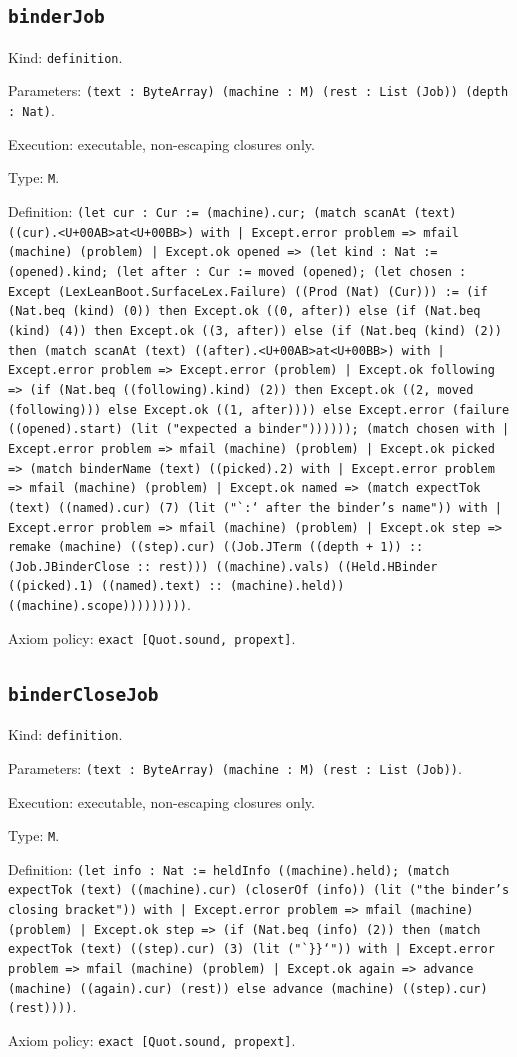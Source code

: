 \documentclass[11pt]{article}
\begin{document}
\subsection*{\texttt{binderJob}}
\noindent Kind: \texttt{definition}.\par
\noindent Parameters: \texttt{(text : ByteArray) (machine : M) (rest : List (Job)) (depth : Nat)}.\par
\noindent Execution: executable, non-escaping closures only.\par
\noindent Type: \texttt{M}.\par
\noindent Definition: \texttt{(let cur : Cur := (machine).cur; (match scanAt (text) ((cur).<U+00AB>at<U+00BB>) with | Except.error problem => mfail (machine) (problem) | Except.ok opened => (let kind : Nat := (opened).kind; (let after : Cur := moved (opened); (let chosen : Except (LexLeanBoot.SurfaceLex.Failure) ((Prod (Nat) (Cur))) := (if (Nat.beq (kind) (0)) then Except.ok ((0, after)) else (if (Nat.beq (kind) (4)) then Except.ok ((3, after)) else (if (Nat.beq (kind) (2)) then (match scanAt (text) ((after).<U+00AB>at<U+00BB>) with | Except.error problem => Except.error (problem) | Except.ok following => (if (Nat.beq ((following).kind) (2)) then Except.ok ((2, moved (following))) else Except.ok ((1, after)))) else Except.error (failure ((opened).start) (lit ("expected a binder")))))); (match chosen with | Except.error problem => mfail (machine) (problem) | Except.ok picked => (match binderName (text) ((picked).2) with | Except.error problem => mfail (machine) (problem) | Except.ok named => (match expectTok (text) ((named).cur) (7) (lit ("`:` after the binder's name")) with | Except.error problem => mfail (machine) (problem) | Except.ok step => remake (machine) ((step).cur) ((Job.JTerm ((depth + 1)) :: (Job.JBinderClose :: rest))) ((machine).vals) ((Held.HBinder ((picked).1) ((named).text) :: (machine).held)) ((machine).scope)))))))))}.\par
\noindent Axiom policy: \texttt{exact [Quot.sound, propext]}.\par
\subsection*{\texttt{binderCloseJob}}
\noindent Kind: \texttt{definition}.\par
\noindent Parameters: \texttt{(text : ByteArray) (machine : M) (rest : List (Job))}.\par
\noindent Execution: executable, non-escaping closures only.\par
\noindent Type: \texttt{M}.\par
\noindent Definition: \texttt{(let info : Nat := heldInfo ((machine).held); (match expectTok (text) ((machine).cur) (closerOf (info)) (lit ("the binder's closing bracket")) with | Except.error problem => mfail (machine) (problem) | Except.ok step => (if (Nat.beq (info) (2)) then (match expectTok (text) ((step).cur) (3) (lit ("`\}\}`")) with | Except.error problem => mfail (machine) (problem) | Except.ok again => advance (machine) ((again).cur) (rest)) else advance (machine) ((step).cur) (rest))))}.\par
\noindent Axiom policy: \texttt{exact [Quot.sound, propext]}.\par
\end{document}
